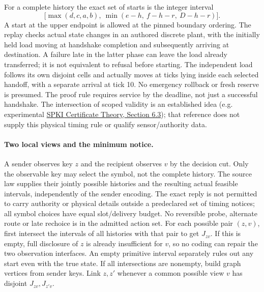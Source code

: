 \documentclass{article}
\begin{document}
For a complete history the exact set of starts is the integer
interval
\[
 \big[\max(d,c,a,b),\ \min(e-h,\ f-h-r,\ D-h-r)\big].
\]
A start at the upper endpoint is allowed at the pinned boundary
ordering. The replay checks actual state changes in an authored
discrete plant, with the initially held load moving at handshake
completion and subsequently arriving at destination. A failure
late in the latter phase can leave the load already transferred;
it is not equivalent to refusal before starting. The independent
load follows its own disjoint cells and actually moves at ticks lying
inside each selected handoff, with a separate arrival at tick 10. No emergency rollback
or fresh reserve is presumed. The proof rule requires service
by the deadline, not just a successful handshake.
The intersection of scoped validity is an established idea
(e.g. experimental \href{https://datatracker.ietf.org/doc/html/rfc2693\#section-6.3}{SPKI
Certificate Theory, Section 6.3}); that reference does not supply
this physical timing rule or qualify sensor/authority data.

\paragraph{Two local views and the minimum notice.}
A sender observes key \(z\) and the recipient observes \(v\) by the
decision cut. Only the observable key may select the symbol, not the
complete history. The source law supplies their jointly possible
histories and the resulting actual feasible intervals, independently
of the sender encoding. The exact reply is not permitted to carry
authority or physical details outside a predeclared set of
timing notices; all symbol choices have equal slot/delivery budget.
No reversible probe, alternate route or late rechoice is in the
admitted action set. For each possible pair \((z,v)\), first
intersect the intervals of all histories with that pair to get \(J_{zv}\).
If this is empty, full disclosure of \(z\) is already insufficient
for \(v\), so no coding can repair the two observation interfaces.
An empty primitive interval separately rules out any start even
with the true state. If all intersections are nonempty, build graph
vertices from sender keys. Link \(z,z'\) whenever a common possible
view \(v\) has disjoint \(J_{zv},J_{z'v}\).
\end{document}
